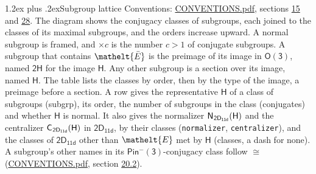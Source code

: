 \documentclass[10pt,a4paper]{article}
\makeatletter
\renewcommand\section{\@startsection{section}{1}{\z@}{-3ex plus -1ex minus -.2ex}%
  {1.2ex plus .2ex}{\normalfont\large\sffamily\bfseries\color{parttitle}}}
\numberwithin{equation}{section}
\newcommand{\eltfont}[1]{{\let\sigma\eltsigma\mathelt{#1}}}
\newcommand{\grp}[1]{\mathsf{#1}}
\newcommand{\cls}[1]{\eltfont{#1}}
\newcommand{\elt}[1]{\eltfont{#1}}
\newcommand{\samecls}{\cong}
\newcommand{\barred}[1]{\bar{#1}}
\newcommand{\hairsp}{\mkern1mu}
\makeatother
\begin{document}
\section{Subgroup lattice}\label{s:subgroups}
Conventions: \href{../../CONVENTIONS.pdf}{CONVENTIONS.pdf}, sections \href{../../../rotation/CONVENTIONS.pdf\#conv.15}{15} and \href{../../CONVENTIONS.pdf\#conv.28}{28}.
The diagram shows the conjugacy classes of subgroups, each joined to the classes of its maximal subgroups, and the orders increase upward. A normal subgroup is framed, and ${\times}c$ is the number $c > 1$ of conjugate subgroups. \label{n:group.H}A subgroup that contains $\elt{\barred{E}}$ is the preimage of its image in $\grp{O(3)}$, named $\grp{2H}$ for the image $\grp{H}$. Any other subgroup is a section over its image, named $\grp{H}$. The table lists the classes by order, then by the type of the image, a preimage before a section. \label{n:head.subgroup}\label{n:head.order}\label{n:head.conjugates}\label{n:head.normal}A row gives the representative $\grp{H}$ of a class of subgroups (subgrp), its order, the number of subgroups in the class (conjugates) and whether $\grp{H}$ is normal. \label{n:group.normalizer}\label{n:group.centralizer}\label{n:head.classes}It also gives the normalizer $\grp{N}_{\hairsp \grp{2D_{11d}}}(\grp{H})$ and the centralizer $\grp{C}_{\hairsp \grp{2D_{11d}}}(\grp{H})$ in $\grp{2D_{11d}}$, by their classes (\texttt{normalizer}, \texttt{centralizer}), and the classes of $\grp{2D_{11d}}$ other than $\cls{E}$ met by $\grp{H}$ (classes, a dash for none). A subgroup's other names in its \href{Pinminus3.pdf}{$\grp{Pin^{-}(3)}$}-conjugacy class follow $\samecls$ (\href{../../CONVENTIONS.pdf}{CONVENTIONS.pdf}, section \href{../../CONVENTIONS.pdf\#conv.20.2}{20.2}).
\end{document}
